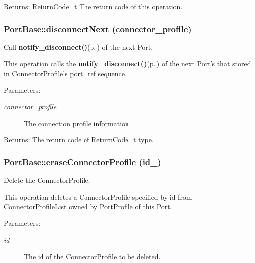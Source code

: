 \begin{Desc}
\item[Returns:]Return\-Code\_\-t The return code of this operation.\end{Desc}
\subsubsection{\setlength{\rightskip}{0pt plus 5cm}Port\-Base::disconnect\-Next (connector\_\-profile)}\label{classPortBase_PortBasea16}


Call {\bf notify\_\-disconnect()}{\rm (p.\,\pageref{classPortBase_PortBasea8})} of the next Port. 

This operation calls the {\bf notify\_\-disconnect()}{\rm (p.\,\pageref{classPortBase_PortBasea8})} of the next Port's that stored in Connector\-Profile's port\_\-ref sequence.

\begin{Desc}
\item[Parameters:]
\begin{description}
\item[{\em connector\_\-profile}]The connection profile information \end{description}
\end{Desc}
\begin{Desc}
\item[Returns:]The return code of Return\-Code\_\-t type.\end{Desc}
\subsubsection{\setlength{\rightskip}{0pt plus 5cm}Port\-Base::erase\-Connector\-Profile (id\_\-)}\label{classPortBase_PortBasea24}


Delete the Connector\-Profile. 

This operation deletes a Connector\-Profile specified by id from Connector\-Profile\-List owned by Port\-Profile of this Port.

\begin{Desc}
\item[Parameters:]
\begin{description}
\item[{\em id}]The id of the Connector\-Profile to be deleted.\end{description}
\end{Desc}
